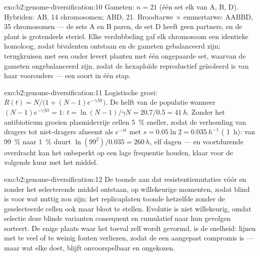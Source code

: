 \begin{solution}{exo:b2:genome-diversification:10}
Gameten: $n = 21$ (één set elk van A, B, D). Hybriden: AB, 14
chromosomen; ABD, 21. Broodtarwe $\times$ emmertarwe: AABBD, 35
chromosomen --- de sets A en B paren, de set D heeft geen partners,
en de plant is grotendeels steriel. Elke verdubbeling gaf elk chromosoom
een identieke homoloog, zodat bivalenten ontstaan en de gameten
gebalanceerd zijn; terugkruisen met een ouder levert planten met één
ongepaarde set, waarvan de gameten ongebalanceerd zijn, zodat de
hexaploïde reproductief geïsoleerd is van haar voorouders --- een soort
in één stap.
\end{solution}

\begin{solution}{exo:b2:genome-diversification:11}
Logistische groei: $R(t) = N/\bigl(1 + (N - 1)e^{-\gamma Nt}\bigr)$.
De helft van de populatie wanneer $(N - 1)e^{-\gamma Nt} = 1$: $t = \ln(N -
1)/\gamma N = 20.7/0.5 = \qty{41}{h}$. Zonder het antibioticum groeien
plasmidevrije cellen \qty{5}{\%} sneller, zodat de verhouding van dragers
tot niet-dragers afneemt als $e^{-st}$ met $s = 0.05\ln 2 =
\qty{0.035}{h^{-1}}$ ( \qty{1}{h}): van
\qty{99}{\%} naar \qty{1}{\%} duurt $\ln(99^2)/0.035 = \qty{260}{h}$,
elf dagen --- en voortdurende overdracht kan het  onbeperkt op een
lage frequentie houden, klaar voor de volgende kuur met het middel.
\end{solution}

\begin{solution}{exo:b2:genome-diversification:12}
De  toonde aan dat resistentiemutaties vóór en zonder het
selecterende middel ontstaan, op willekeurige momenten, zodat 
blind is voor wat nuttig zou zijn; het replicaplaten toonde hetzelfde
zonder de geselecteerde cellen ook maar bloot te stellen. Evolutie is
niet willekeurig, omdat selectie deze blinde varianten consequent en
cumulatief naar hun gevolgen sorteert. De enige plaats waar het toeval
zelf wordt gevormd, is de snelheid: lijnen met te veel of te weinig
fouten verliezen, zodat de  een aangepast compromis is
--- maar wat elke  doet, blijft onvoorspelbaar en ongekozen.
\end{solution}

